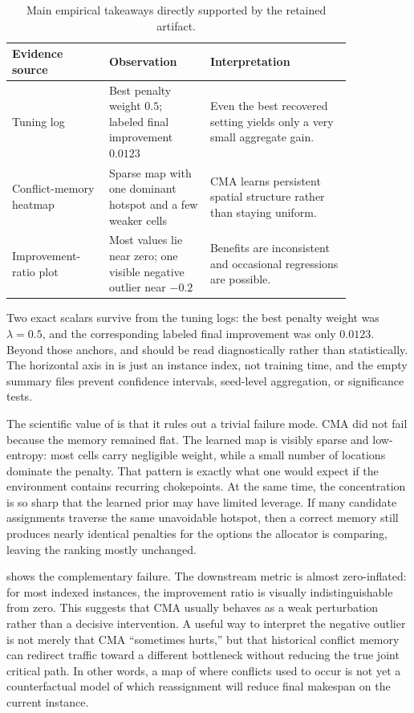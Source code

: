\documentclass{article} %
\begin{document}
\begin{table}[t]
\centering
\small
\caption{Main empirical takeaways directly supported by the retained artifact.}
\label{tab:takeaways}
\begin{tabular}{p{0.24\linewidth}p{0.25\linewidth}p{0.35\linewidth}}
\toprule
Evidence source & Observation & Interpretation \\
\midrule
Tuning log & Best penalty weight $0.5$; labeled final improvement $0.0123$ & Even the best recovered setting yields only a very small aggregate gain. \\
Conflict-memory heatmap & Sparse map with one dominant hotspot and a few weaker cells & CMA learns persistent spatial structure rather than staying uniform. \\
Improvement-ratio plot & Most values lie near zero; one visible negative outlier near $-0.2$ & Benefits are inconsistent and occasional regressions are possible. \\
\bottomrule
\end{tabular}
\end{table}

Two exact scalars survive from the tuning logs: the best penalty weight was $\lambda=0.5$, and the corresponding labeled final improvement was only $0.0123$. Beyond those anchors,  and  should be read diagnostically rather than statistically. The horizontal axis in  is just an instance index, not training time, and the empty summary files prevent confidence intervals, seed-level aggregation, or significance tests.

The scientific value of  is that it rules out a trivial failure mode. CMA did not fail because the memory remained flat. The learned map is visibly sparse and low-entropy: most cells carry negligible weight, while a small number of locations dominate the penalty. That pattern is exactly what one would expect if the environment contains recurring chokepoints. At the same time, the concentration is so sharp that the learned prior may have limited leverage. If many candidate assignments traverse the same unavoidable hotspot, then a correct memory still produces nearly identical penalties for the options the allocator is comparing, leaving the ranking mostly unchanged.

 shows the complementary failure. The downstream metric is almost zero-inflated: for most indexed instances, the improvement ratio is visually indistinguishable from zero. This suggests that CMA usually behaves as a weak perturbation rather than a decisive intervention. A useful way to interpret the negative outlier is not merely that CMA ``sometimes hurts,'' but that historical conflict memory can redirect traffic toward a different bottleneck without reducing the true joint critical path. In other words, a map of where conflicts used to occur is not yet a counterfactual model of which reassignment will reduce final makespan on the current instance.
\end{document}
